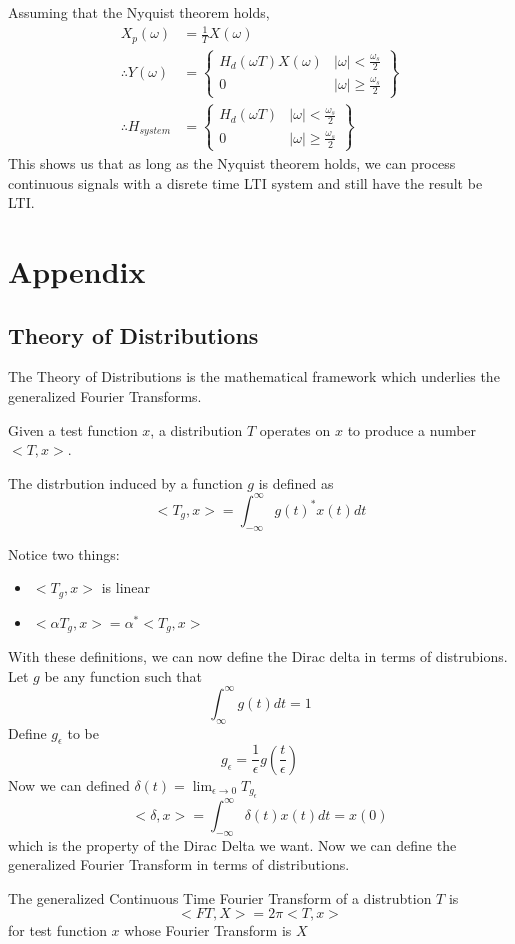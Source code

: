 Assuming that the Nyquist theorem holds,
\begin{align*}
    X_p(\omega) &= \frac{1}{T}X(\omega)\\
    \therefore Y(\omega) &= \left\{
        \begin{array}{cc}
            H_d(\omega T)X(\omega) & |\omega| < \frac{\omega_s}{2}\\
            0 & |\omega| \ge \frac{\omega_s}{2}
        \end{array}
    \right\}\\
        \therefore H_{system} &= \left\{\begin{array}{cc}
            H_d(\omega T) & |\omega| < \frac{\omega_s}{2}\\
            0 & |\omega| \ge \frac{\omega_s}{2}
        \end{array}
        \right\}
\end{align*}
This shows us that as long as the Nyquist theorem holds, we can process continuous signals
with a disrete time LTI system and still have the result be LTI.
\section{Appendix}\label{section:appendix}
\subsection{Theory of Distributions}
The Theory of Distributions is the mathematical framework which underlies the generalized Fourier Transforms.
\begin{definition}
    Given a test function $x$, a distribution $T$ operates on $x$ to produce a number $<T,x>$.
\end{definition}
\begin{definition}
    The distrbution induced by a function $g$ is defined as
    \[
<T_g, x> = \int_{-\infty}^{\infty}{g(t)^*x(t)dt}
\]
\end{definition}
Notice two things:
\begin{itemize}
    \item $<T_g, x>$ is linear
    \item $<\alpha T_g, x> = \alpha^*<T_g, x>$
\end{itemize}
With these definitions, we can now define the Dirac delta in terms of distrubions.
Let $g$ be any function such that
\[
\int_{\infty}^{\infty}{g(t)dt} = 1
\]
Define $g_\epsilon$ to be
\[
g_\epsilon = \frac{1}{\epsilon}g(\frac{t}{\epsilon})
\]
Now we can defined $\delta(t) = \lim_{\epsilon \rightarrow 0}{T_{g_\epsilon}}$
\[
<\delta, x> = \int_{-\infty}^{\infty}{\delta(t)x(t)dt} = x(0)
\] 
which is the property of the Dirac Delta we want. Now we can define the generalized Fourier Transform
in terms of distributions.
\begin{definition}
    The generalized Continuous Time Fourier Transform of a distrubtion $T$ is
    \[
<FT, X> = 2\pi<T, x>
\]
    for test function $x$ whose Fourier Transform is $X$
\end{definition}

